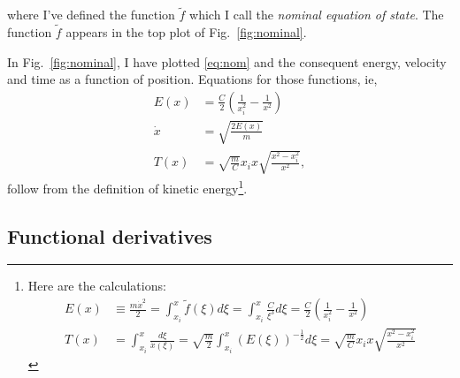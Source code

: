\documentclass[]{article}
\newcommand{\nomf}{\tilde f} \newcommand{\COST}{\cal C}
\newcommand\dum{\xi}
\newcommand\Ddum{d\dum}
\begin{document}
where I've defined the function $\nomf$ which I call the \emph{nominal
  equation of state}.  The function $\nomf$ appears in the top plot of
Fig.~\ref{fig:nominal}.
\begin{figure*}
  \centering
    \caption{Here are characteristics of the gun using the nominal
      EOS.  Top plot: The nominal EOS (along the relevant isentrope).
      Second plot: Energy (of the projectile) as a function of
      position.  Third plot: Velocity as a function of position.
      Fourth plot: Time as a function of position.}
  \label{fig:nominal}
\end{figure*}

In Fig.~\ref{fig:nominal}, I have plotted \eqref{eq:nom} and the
consequent energy, velocity and time as a function of position.
Equations for those functions, ie,
\begin{align}
  \label{eq:enom}
  E(x) &= \frac{C}{2} \left(\frac{1}{x_i^2} - \frac{1}{x^2} \right) \\
  \dot x &= \sqrt{\frac{2E(x)}{m}} \\
  \label{eq:tnom}
  T(x) &= \sqrt{\frac{m}{C}} x_i x \sqrt{ \frac{x^2 -x_i^2}{x^2}},
\end{align}
follow from the definition of kinetic energy\footnote{
  Here are the calculations:
  \begin{align*}
    E(x) &\equiv \frac{m\dot x^2}{2} = \int_{x_i}^x \nomf(\dum) \Ddum=
    \int_{x_i}^x \frac{C}{\dum^3} \Ddum  = \frac{C}{2} \left(
      \frac{1}{x_i^2} - \frac{1}{x^2} \right) \\
    T(x) &= \int_{x_i}^x \frac{\Ddum}{\dot x(\dum)} =
    \sqrt{\frac{m}{2}} \int_{x_i}^x \left( E(\dum)
    \right)^{-\frac{1}{2}} \Ddum = \sqrt{\frac{m}{C}} x_i x \sqrt{
      \frac{x^2 -x_i^2}{x^2}}
  \end{align*}
}.

\subsection{Functional derivatives}
\label{sec:frechet}
\end{document}
